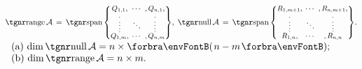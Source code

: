 $\range \mathcal{A}\,=\,\Spn{\small\begin{Bmatrix} \underset{\;,}{Q_{1,1}}, &\hspace{-6pt} \cdots &\hspace{-6pt} ,\underset{\!,}{Q_{n,1}},\\[-2pt] \vdots &\hspace{-6pt} \ddots &\hspace{-6pt} \vdots\\[-2pt] \overset{\;,}{Q_{1,m}}, &\hspace{-6pt} \cdots &\hspace{-6pt} ,\overset{\!\!\!,}{Q_{n,m}}\end{Bmatrix}},\;\null \mathcal{A}\,=\,\Spn{\small\begin{Bmatrix} \underset{\;,}{R_{1,m+1}}, &\hspace{-6pt} \cdots &\hspace{-6pt} ,\underset{\!\!,}{R_{n,m+1}},\\[-2pt] \vdots &\hspace{-6pt} \ddots &\hspace{-6pt} \vdots\\[-2pt] \overset{\;,}{R_{1,n}}, &\hspace{-6pt} \cdots &\hspace{-6pt} ,\overset{\!\!\!,}{R_{n,n}}\end{Bmatrix}}.$
\;\;$\hText{$
(a) $\dim\null \mathcal{A}=n\times\Par{n-m};\\$
(b) $\dim\range \mathcal{A}=n\times m.}$\par\PfEnd[-10pt]\vspace{-4pt}
\SepLine


